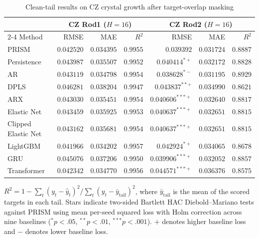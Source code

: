 \begin{table}[!t]
\centering
\caption{Clean-tail results on CZ crystal growth after target-overlap masking}
\label{tab:clean-cz}
\small
\begin{tabular}{lrrrrrr}
\hline
 & \multicolumn{3}{c}{CZ Rod1 ($H=16$)} & \multicolumn{3}{c}{CZ Rod2 ($H=16$)} \\
\cline{2-4}\cline{5-7}
Method & RMSE & MAE & $R^2$ & RMSE & MAE & $R^2$ \\
\hline
PRISM & \(0.042520\) & \(0.034395\) & \(0.9955\) & \(0.039392\) & \(0.031724\) & \(0.8887\) \\
Persistence & \(0.043987\) & \(0.035507\) & \(0.9952\) & \(0.040414^{\ast+}\) & \(0.032172\) & \(0.8828\) \\
AR & \(0.043119\) & \(0.034798\) & \(0.9954\) & \(0.038628^{\ast-}\) & \(0.031195\) & \(0.8929\) \\
DPLS & \(0.046281\) & \(0.038204\) & \(0.9947\) & \(0.043837^{\ast\ast+}\) & \(0.034990\) & \(0.8621\) \\
ARX & \(0.043030\) & \(0.035451\) & \(0.9954\) & \(0.040606^{\ast\ast\ast+}\) & \(0.032640\) & \(0.8817\) \\
Elastic Net & \(0.043459\) & \(0.035925\) & \(0.9953\) & \(0.040637^{\ast\ast\ast+}\) & \(0.032651\) & \(0.8815\) \\
Clipped Elastic Net & \(0.043162\) & \(0.035681\) & \(0.9954\) & \(0.040637^{\ast\ast\ast+}\) & \(0.032651\) & \(0.8815\) \\
LightGBM & \(0.041966\) & \(0.034202\) & \(0.9957\) & \(0.042924^{\ast+}\) & \(0.034065\) & \(0.8678\) \\
GRU & \(0.045076\) & \(0.037206\) & \(0.9950\) & \(0.039906^{\ast\ast\ast+}\) & \(0.032052\) & \(0.8857\) \\
Transformer & \(0.042342\) & \(0.034770\) & \(0.9956\) & \(0.044571^{\ast\ast\ast+}\) & \(0.036376\) & \(0.8575\) \\
\hline
\end{tabular}
\par\smallskip
\parbox{0.96\textwidth}{\footnotesize $R^2=1-\sum_t(y_t-\hat y_t)^2/\sum_t(y_t-\bar y_{\mathrm{tail}})^2$, where $\bar y_{\mathrm{tail}}$ is the mean of the scored targets in each tail. Stars indicate two-sided Bartlett HAC Diebold--Mariano tests against PRISM using mean per-seed squared loss with Holm correction across nine baselines (\({}^*p<.05\), \({}^{**}p<.01\), \({}^{***}p<.001\)). \(+\) denotes higher baseline loss and \(-\) denotes lower baseline loss.}
\end{table}

